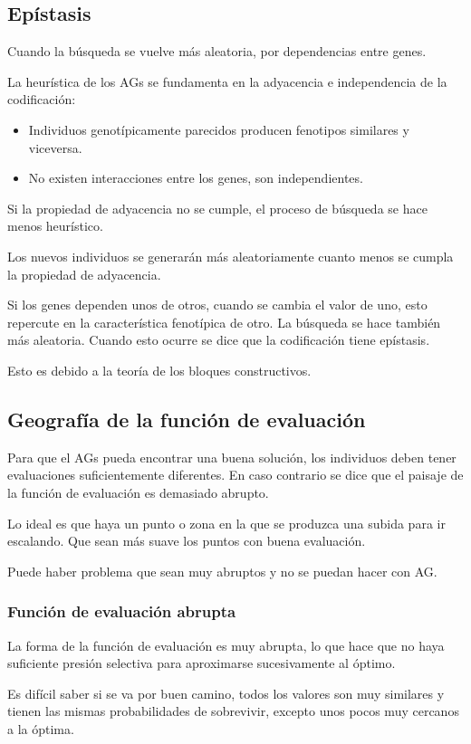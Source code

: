 \documentclass[12pt, twoside, openright]{report} %
\begin{document}
\subsection{Epístasis}
Cuando la búsqueda se vuelve más aleatoria, por dependencias entre genes.

La heurística de los AGs se fundamenta en la adyacencia e independencia de la codificación:
\begin{itemize}
	\item Individuos genotípicamente parecidos producen fenotipos similares y viceversa.
	\item No existen interacciones entre los genes, son independientes.
\end{itemize}

Si la propiedad de adyacencia no se cumple, el proceso de búsqueda se hace menos heurístico.

Los nuevos individuos se generarán más aleatoriamente cuanto menos se cumpla la propiedad de adyacencia.

Si los genes dependen unos de otros, cuando se cambia el valor de uno, esto repercute en la característica fenotípica de otro. La búsqueda se hace también más aleatoria. Cuando esto ocurre se dice que la codificación tiene epístasis.

Esto es debido a la teoría de los bloques constructivos.

\subsection{Geografía de la función de evaluación}
Para que el AGs pueda encontrar una buena solución, los individuos deben tener evaluaciones suficientemente diferentes.  En caso contrario se dice que el paisaje de la función de evaluación es demasiado abrupto.

Lo ideal es que haya un punto o zona en la que se produzca una subida para ir escalando. Que sean más suave los puntos con buena evaluación.

Puede haber problema que sean muy abruptos y no se puedan hacer con AG.

\subsubsection{Función de evaluación abrupta}
La forma de la función de evaluación es muy abrupta, lo que hace que no haya suficiente presión selectiva para aproximarse sucesivamente al óptimo.

Es difícil saber si se va por buen camino, todos los valores son muy similares y tienen las mismas probabilidades de sobrevivir, excepto unos pocos muy cercanos a la óptima.
\end{document}
